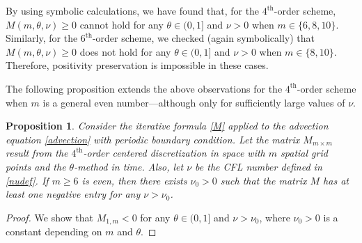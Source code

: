 \documentclass[smallextended,numbook,runningheads]{svjour3}     %
\newtheorem{proposition}{Proposition}
\newtheorem{proposition}{Proposition}
\begin{document}
\begin{description}[style=unboxed,leftmargin=0cm]
\item [{Case 1:} $m$ is {even}.]
\item \noindent By using symbolic calculations,  we have found that, for the $4^\text{th}$-order scheme, 
$M(m,\theta,\nu)\ge 0$ cannot hold for any $\theta\in(0,1]$ and $\nu>0$ when $m\in\{6,8,10\}$.
Similarly, for the $6^\text{th}$-order scheme, we checked (again symbolically) that $M(m,\theta,\nu)\ge 0$
does not hold for any $\theta\in(0,1]$ and $\nu>0$ when $m\in\{8,10\}$.
Therefore, positivity preservation is impossible in these cases.

The following proposition extends the above observations for the $4^\text{th}$-order scheme when $m$ is a
general even number---although only for sufficiently large values of $\nu$.
\begin{proposition}\label{m_even_nonpositivityFE}
	Consider the iterative formula \eqref{M} applied to the advection equation \eqref{advection} with periodic
	boundary condition.
	Let the matrix $M_{m \times m}$ result from the $4^\text{th}$-order centered discretization in space with
	$m$ spatial grid points and the $\theta$-method in time.
	Also, let $\nu$ be the CFL number defined in \eqref{nudef}.
	If $m \ge 6$ is \emph{even}, then there exists $\nu_0  > 0$ such that the matrix $M$ has at least one
	negative entry for any $\nu > \nu_0$.
\end{proposition}
\begin{proof}
	We show that $M_{1,m} < 0$ for any $\theta \in (0,1]$ and $\nu > \nu_0$,
	where $\nu_0 > 0$ is a constant depending on $m$ and $\theta$.
	

\end{proof}
\end{description}
\end{document}
